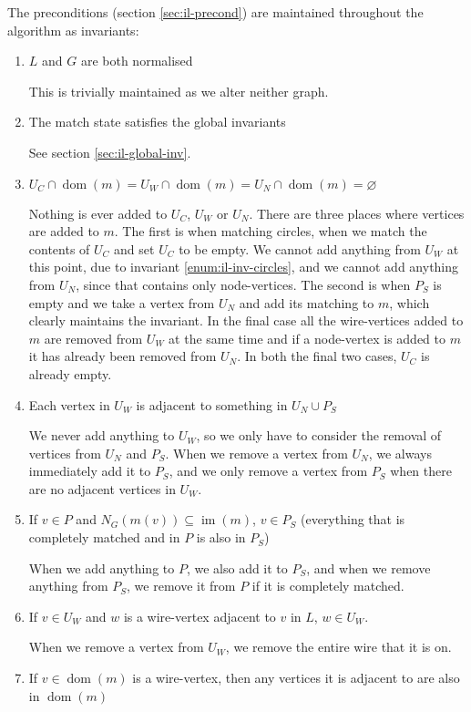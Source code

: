 \documentclass{article}
\DeclareMathOperator{\dom}{dom}
\DeclareMathOperator{\im}{im}
\begin{document}
The preconditions (section \ref{sec:il-precond}) are maintained throughout the algorithm as invariants:

\begin{enumerate}[label=(\roman*),ref=(\roman*)]
  \item $L$ and $G$ are both normalised

  This is trivially maintained as we alter neither graph.
  \item The match state satisfies the global invariants

  See section \ref{sec:il-global-inv}.
  \item $U_C\cap\dom(m) = U_W\cap\dom(m) = U_N\cap\dom(m) = \varnothing$

  Nothing is ever added to $U_C$, $U_W$ or $U_N$.  There are three places where vertices are added to $m$.  The first is when matching circles, when we match the contents of $U_C$ and set $U_C$ to be empty.  We cannot add anything from $U_W$ at this point, due to invariant \ref{enum:il-inv-circles}, and we cannot add anything from $U_N$, since that contains only node-vertices.  The second is when $P_S$ is empty and we take a vertex from $U_N$ and add its matching to $m$, which clearly maintains the invariant.  In the final case all the wire-vertices added to $m$ are removed from $U_W$ at the same time and if a node-vertex is added to $m$ it has already been removed from $U_N$.  In both the final two cases, $U_C$ is already empty.
  \item Each vertex in $U_W$ is adjacent to something in $U_N\cup P_S$

  We never add anything to $U_W$, so we only have to consider the removal of vertices from $U_N$ and $P_S$.  When we remove a vertex from $U_N$, we always immediately add it to $P_S$, and we only remove a vertex from $P_S$ when there are no adjacent vertices in $U_W$.
  \item If $v \in P$ and $N_G(m(v)) \subseteq \im(m)$, $v \in P_S$ (everything that is completely matched and in $P$ is also in $P_S$)

  When we add anything to $P$, we also add it to $P_S$, and when we remove anything from $P_S$, we remove it from $P$ if it is completely matched.
  \item If $v \in U_W$ and $w$ is a wire-vertex adjacent to $v$ in $L$, $w \in U_W$.

  When we remove a vertex from $U_W$, we remove the entire wire that it is on.
  \item If $v \in \dom(m)$ is a wire-vertex, then any vertices it is adjacent to are also in $\dom(m)$


\end{enumerate}
\end{document}
